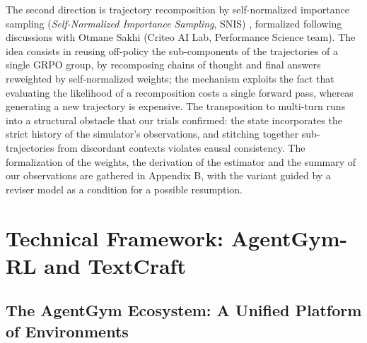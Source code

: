 \documentclass[11pt,a4paper]{article}
\begin{document}
The second direction is trajectory recomposition by self-normalized importance sampling (\emph{Self-Normalized Importance Sampling}, SNIS) \cite[chap.~9]{owen2013montecarlo}, formalized following discussions with Otmane Sakhi (Criteo AI Lab, Performance Science team). The idea consists in reusing off-policy the sub-components of the trajectories of a single GRPO group, by recomposing chains of thought and final answers reweighted by self-normalized weights; the mechanism exploits the fact that evaluating the likelihood of a recomposition costs a single forward pass, whereas generating a new trajectory is expensive. The transposition to multi-turn runs into a structural obstacle that our trials confirmed: the state incorporates the strict history of the simulator's observations, and stitching together sub-trajectories from discordant contexts violates causal consistency. The formalization of the weights, the derivation of the estimator and the summary of our observations are gathered in Appendix B, with the variant guided by a reviser model as a condition for a possible resumption.



















\newpage
\section{Technical Framework: AgentGym-RL and TextCraft}


\subsection{The AgentGym Ecosystem: A Unified Platform of Environments}
\end{document}
